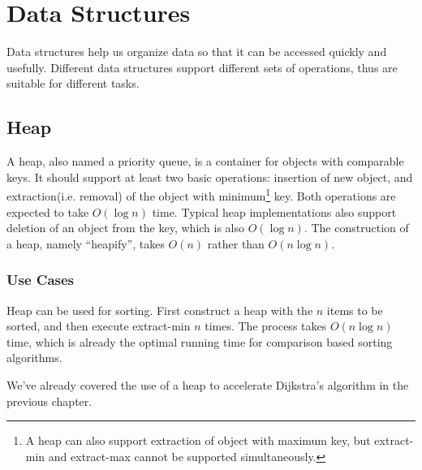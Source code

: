 \ifx\PREAMBLE\undefined


\fi
\chapter{Data Structures}
Data structures help us organize data so that it can be accessed quickly and usefully. Different data structures support different sets of operations, thus are suitable for different tasks.
\section{Heap}
A heap, also named a priority queue, is a container for objects with comparable keys. It should support at least two basic operations: insertion of new object, and extraction(i.e. removal) of the object with minimum\footnote{A heap can also support extraction of object with maximum key, but extract-min and extract-max cannot be supported simultaneously.} key. Both operations are expected to take $O(\log n)$ time. Typical heap implementations also support deletion of an object from the key, which is also $O(\log n)$. The construction of a heap, namely ``heapify'', takes $O(n)$ rather than $O(n\log n)$.
\subsection{Use Cases}
Heap can be used for sorting. First construct a heap with the $n$ items to be sorted, and then execute extract-min $n$ times. The process takes $O(n\log n)$ time, which is already the optimal running time for comparison based sorting algorithms. 

We've already covered the use of a heap to accelerate Dijkstra's algorithm in the previous chapter.

